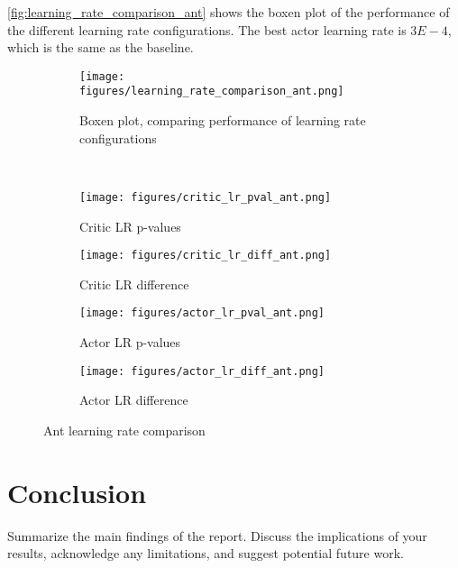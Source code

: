 \documentclass{article}
\begin{document}
\autoref{fig:learning_rate_comparison_ant} shows the boxen plot of the performance of the different learning rate configurations. The best actor learning rate is \(3E-4\), which is the same as the baseline.

\begin{figure}[h!]
    \centering
    \begin{subfigure}{0.4\textwidth}
        \centering
        \texttt{[image: figures/learning\_rate\_comparison\_ant.png]}
        \captionsetup{justification=centering}
        \caption{Boxen plot, comparing performance of learning rate configurations}
        \label{fig:learning_rate_comparison_ant}
    \end{subfigure}
    \\
    \begin{subfigure}{0.24\textwidth}
        \centering
        \texttt{[image: figures/critic\_lr\_pval\_ant.png]}
        \captionsetup{justification=centering}
        \caption{Critic LR p-values}
        \label{fig:critic_lr_pval_ant}
    \end{subfigure}
    \begin{subfigure}{0.24\textwidth}
        \centering
        \texttt{[image: figures/critic\_lr\_diff\_ant.png]}
        \captionsetup{justification=centering}
        \caption{Critic LR difference}
        \label{fig:critic_lr_diff_ant}
    \end{subfigure}
    \begin{subfigure}{0.24\textwidth}
        \centering
        \texttt{[image: figures/actor\_lr\_pval\_ant.png]}
        \captionsetup{justification=centering}
        \caption{Actor LR p-values}
        \label{fig:actor_lr_pval_ant}
    \end{subfigure}
    \begin{subfigure}{0.24\textwidth}
        \centering
        \texttt{[image: figures/actor\_lr\_diff\_ant.png]}
        \captionsetup{justification=centering}
        \caption{Actor LR difference}
        \label{fig:actor_lr_diff_ant}
    \end{subfigure}
    \caption{Ant learning rate comparison}
    \label{fig:ant_analysis}
\end{figure}

\section{Conclusion}
Summarize the main findings of the report. Discuss the implications of your results, acknowledge any limitations, and suggest potential future work.

\end{document}
